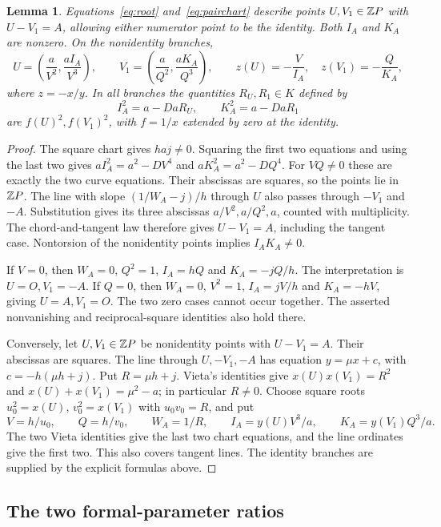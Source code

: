 \documentclass[11pt,a4paper]{article}
\newtheorem{lemma}[theorem]{Lemma}
\begin{document}
\begin{lemma}\label{lem:pairchart}
Equations~\eqref{eq:root} and~\eqref{eq:pairchart} describe points
$U,V_1\in\mathbb Z P$ with $U-V_1=A$, allowing either numerator point
to be the identity. Both $I_A$ and $K_A$ are nonzero. On the
nonidentity branches,
\[
 U=\left(\frac a{V^2},\frac{aI_A}{V^3}\right),\qquad
 V_1=\left(\frac a{Q^2},\frac{aK_A}{Q^3}\right),
 \qquad z(U)=-\frac V{I_A},\quad z(V_1)=-\frac Q{K_A},
\]
where $z=-x/y$. In all branches the quantities $R_U,R_1\in K$
defined by
\begin{equation}\label{eq:recipsquares}
             I_A^2=a-DaR_U,\qquad K_A^2=a-DaR_1
\end{equation}
are $f(U)^2,f(V_1)^2$, with $f=1/x$ extended by zero at the identity.
\end{lemma}
\begin{proof}
The square chart gives $haj\ne0$.
Squaring the first two equations and using the last two gives
$aI_A^2=a^2-DV^4$ and $aK_A^2=a^2-DQ^4$.
For $VQ\ne0$ these are exactly the two curve equations. Their
abscissas are squares, so the points lie in $\mathbb Z P$.
The line with slope $(1/W_A-j)/h$ through $U$ also passes through
$-V_1$ and $-A$. Substitution gives its three abscissas
$a/V^2,a/Q^2,a$, counted with multiplicity. The chord-and-tangent
law therefore gives $U-V_1=A$, including the tangent case.
Nontorsion of the nonidentity points implies $I_AK_A\ne0$.

If $V=0$, then $W_A=0$, $Q^2=1$, $I_A=hQ$ and
$K_A=-jQ/h$. The interpretation is $U=O,V_1=-A$.
If $Q=0$, then $W_A=0$, $V^2=1$, $I_A=jV/h$ and
$K_A=-hV$, giving $U=A,V_1=O$. The two zero cases cannot occur
together. The asserted nonvanishing and reciprocal-square identities
also hold there.

Conversely, let $U,V_1\in\mathbb Z P$ be nonidentity points with $U-V_1=A$.
Their abscissas are squares. The line through $U,-V_1,-A$ has equation
$y=\mu x+c$, with $c=-h(\mu h+j)$. Put $R=\mu h+j$.
Vieta's identities give
$x(U)x(V_1)=R^2$ and $x(U)+x(V_1)=\mu^2-a$; in particular $R\ne0$.
Choose square roots $u_0^2=x(U)$, $v_0^2=x(V_1)$ with $u_0v_0=R$,
and put
\[
 V=h/u_0,\qquad Q=h/v_0,\qquad W_A=1/R,\qquad
 I_A=y(U)V^3/a,\qquad K_A=y(V_1)Q^3/a.
\]
The two Vieta identities give the last two chart equations, and the
line ordinates give the first two. This also covers tangent lines.
The identity branches are supplied by the explicit formulas above.
\end{proof}

\subsection{The two formal-parameter ratios}
\end{document}
